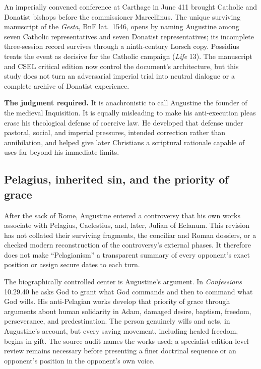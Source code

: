 An imperially convened conference at Carthage in June 411 brought Catholic and
Donatist bishops before the commissioner Marcellinus. The unique surviving
manuscript of the \emph{Gesta}, BnF lat.~1546, opens by naming Augustine among
seven Catholic representatives and seven Donatist representatives; its
incomplete three-session record survives through a ninth-century Lorsch copy.
Possidius treats the event as decisive for the Catholic campaign
(\emph{Life} 13). The manuscript and CSEL critical edition now control the
document's architecture, but this study does not turn an adversarial imperial
trial into neutral dialogue or a complete archive of Donatist experience.

\begin{studyframe}
\textbf{The judgment required.} It is anachronistic to call Augustine the
founder of the medieval Inquisition. It is equally misleading to make his
anti-execution pleas erase his theological defense of coercive law. He
developed that defense under pastoral, social, and imperial pressures, intended
correction rather than annihilation, and helped give later Christians a
scriptural rationale capable of uses far beyond his immediate limits.
\end{studyframe}

\subsection{Pelagius, inherited sin, and the priority of grace}

After the sack of Rome, Augustine entered a controversy that his own works
associate with Pelagius, Caelestius, and, later, Julian of Eclanum. This
revision has not collated their surviving fragments, the conciliar and Roman
dossiers, or a checked modern reconstruction of the controversy's external
phases. It therefore does not make “Pelagianism” a transparent summary of
every opponent's exact position or assign secure dates to each turn.

The biographically controlled center is Augustine's argument. In
\emph{Confessions} 10.29.40 he asks God to grant what God commands and then to
command what God wills. His anti-Pelagian works develop that priority of grace
through arguments about human solidarity in Adam, damaged desire, baptism,
freedom, perseverance, and predestination. The person genuinely wills and
acts, in Augustine's account, but every saving movement, including healed
freedom, begins in gift. The source audit names the works used; a specialist
edition-level review remains necessary before presenting a finer doctrinal
sequence or an opponent's position in the opponent's own voice.

